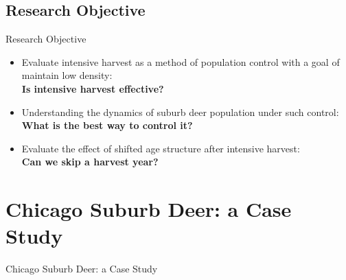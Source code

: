\documentclass{beamer}
\begin{document}
\subsection{Research Objective}
\begin{frame}{Research Objective}
\renewcommand\baselinestretch{1.25}\selectfont
	\begin{itemize}
		\item Evaluate intensive harvest as a method of population control with a goal of maintain low density: \textbf{\\  Is intensive harvest effective?}\pause
		\item Understanding the dynamics of suburb deer population under such control: \textbf{\\  What is the best way to control it?}\pause
		\item Evaluate the effect of shifted age structure after intensive harvest: \textbf{\\  Can we skip a harvest year?}\pause
	\end{itemize}
\renewcommand\baselinestretch{1}\selectfont
\end{frame}

\section{Chicago Suburb Deer: a Case Study}
\begin{frame}
\LARGE{Chicago Suburb Deer: a Case Study}
\end{frame}

\end{document}
